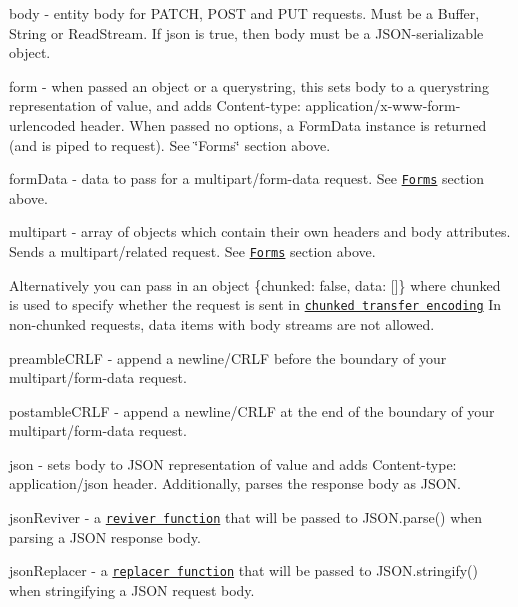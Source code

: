 \begin{DoxyItemize}
\item {\ttfamily body} -\/ entity body for P\+A\+T\+CH, P\+O\+ST and P\+UT requests. Must be a {\ttfamily Buffer}, {\ttfamily String} or {\ttfamily Read\+Stream}. If {\ttfamily json} is {\ttfamily true}, then {\ttfamily body} must be a J\+S\+O\+N-\/serializable object.
\item {\ttfamily form} -\/ when passed an object or a querystring, this sets {\ttfamily body} to a querystring representation of value, and adds {\ttfamily Content-\/type\+: application/x-\/www-\/form-\/urlencoded} header. When passed no options, a {\ttfamily Form\+Data} instance is returned (and is piped to request). See \char`\"{}\+Forms\char`\"{} section above.
\item {\ttfamily form\+Data} -\/ data to pass for a {\ttfamily multipart/form-\/data} request. See \href{#forms}{\tt Forms} section above.
\item {\ttfamily multipart} -\/ array of objects which contain their own headers and {\ttfamily body} attributes. Sends a {\ttfamily multipart/related} request. See \href{#forms}{\tt Forms} section above.
\begin{DoxyItemize}
\item Alternatively you can pass in an object {\ttfamily \{chunked\+: false, data\+: \mbox{[}\mbox{]}\}} where {\ttfamily chunked} is used to specify whether the request is sent in \href{https://en.wikipedia.org/wiki/Chunked_transfer_encoding}{\tt chunked transfer encoding} In non-\/chunked requests, data items with body streams are not allowed.
\end{DoxyItemize}
\item {\ttfamily preamble\+C\+R\+LF} -\/ append a newline/\+C\+R\+LF before the boundary of your {\ttfamily multipart/form-\/data} request.
\item {\ttfamily postamble\+C\+R\+LF} -\/ append a newline/\+C\+R\+LF at the end of the boundary of your {\ttfamily multipart/form-\/data} request.
\item {\ttfamily json} -\/ sets {\ttfamily body} to J\+S\+ON representation of value and adds {\ttfamily Content-\/type\+: application/json} header. Additionally, parses the response body as J\+S\+ON.
\item {\ttfamily json\+Reviver} -\/ a \href{https://developer.mozilla.org/en-US/docs/Web/JavaScript/Reference/Global_Objects/JSON/parse}{\tt reviver function} that will be passed to {\ttfamily J\+S\+O\+N.\+parse()} when parsing a J\+S\+ON response body.
\item {\ttfamily json\+Replacer} -\/ a \href{https://developer.mozilla.org/en-US/docs/Web/JavaScript/Reference/Global_Objects/JSON/stringify}{\tt replacer function} that will be passed to {\ttfamily J\+S\+O\+N.\+stringify()} when stringifying a J\+S\+ON request body. 



\end{DoxyItemize}
